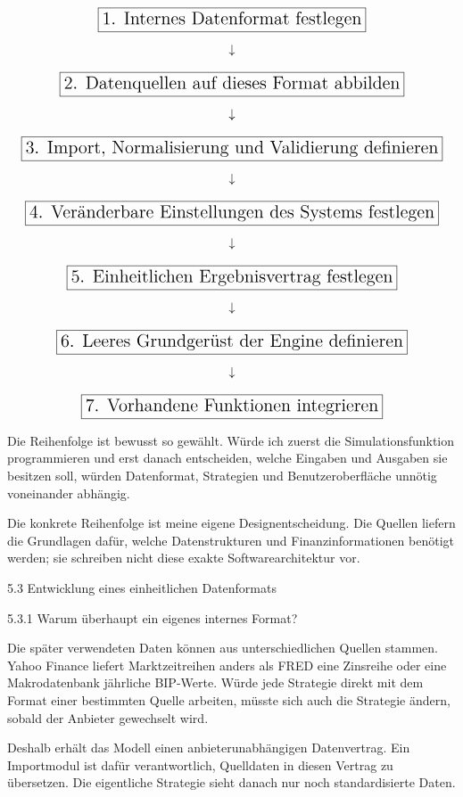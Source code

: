 \documentclass[
  ngerman,
  a4paper,
  DIV=11,
  oneside]{scrreprt}
\begin{document}
\[
\begin{array}{c}
\boxed{\text{\Large 1. Internes Datenformat festlegen}}
\\[0.4cm]
\downarrow
\\[0.4cm]
\boxed{\text{\Large 2. Datenquellen auf dieses Format abbilden}}
\\[0.4cm]
\downarrow
\\[0.4cm]
\boxed{\text{\Large 3. Import, Normalisierung und Validierung definieren}}
\\[0.4cm]
\downarrow
\\[0.4cm]
\boxed{\text{\Large 4. Veränderbare Einstellungen des Systems festlegen}}
\\[0.4cm]
\downarrow
\\[0.4cm]
\boxed{\text{\Large 5. Einheitlichen Ergebnisvertrag festlegen}}
\\[0.4cm]
\downarrow
\\[0.4cm]
\boxed{\text{\Large 6. Leeres Grundgerüst der Engine definieren}}
\\[0.4cm]
\downarrow
\\[0.4cm]
\boxed{\text{\Large 7. Vorhandene Funktionen integrieren}}
\end{array}
\]

Die Reihenfolge ist bewusst so gewählt. Würde ich zuerst die
Simulationsfunktion programmieren und erst danach entscheiden, welche
Eingaben und Ausgaben sie besitzen soll, würden Datenformat, Strategien
und Benutzeroberfläche unnötig voneinander abhängig.

Die konkrete Reihenfolge ist meine eigene Designentscheidung. Die
Quellen liefern die Grundlagen dafür, welche Datenstrukturen und
Finanzinformationen benötigt werden; sie schreiben nicht diese exakte
Softwarearchitektur vor.

5.3 Entwicklung eines einheitlichen Datenformats

5.3.1 Warum überhaupt ein eigenes internes Format?

Die später verwendeten Daten können aus unterschiedlichen Quellen
stammen. Yahoo Finance liefert Marktzeitreihen anders als FRED eine
Zinsreihe oder eine Makrodatenbank jährliche BIP-Werte. Würde jede
Strategie direkt mit dem Format einer bestimmten Quelle arbeiten, müsste
sich auch die Strategie ändern, sobald der Anbieter gewechselt wird.

Deshalb erhält das Modell einen anbieterunabhängigen Datenvertrag. Ein
Importmodul ist dafür verantwortlich, Quelldaten in diesen Vertrag zu
übersetzen. Die eigentliche Strategie sieht danach nur noch
standardisierte Daten.
\end{document}
